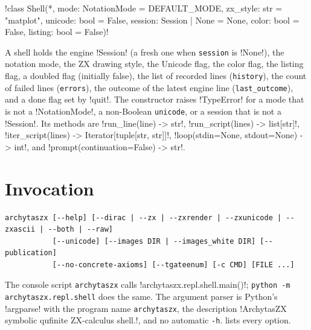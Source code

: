 \begin{signature}
\code!class Shell(*, mode: NotationMode = DEFAULT_MODE, zx_style: str = "matplot", unicode: bool = False, session: Session | None = None, color: bool = False, listing: bool = False)!
\end{signature}
A shell holds the engine \py!Session! (a fresh one when \texttt{session} is \py!None!), the notation mode, the ZX drawing style, the Unicode flag, the color flag, the listing flag, a doubled flag (initially false), the list of recorded lines (\texttt{history}), the count of failed lines (\texttt{errors}), the outcome of the latest engine line (\texttt{last\_outcome}), and a done flag set by \azx!quit!. The constructor raises \py!TypeError! for a mode that is not a \py!NotationMode!, a non-Boolean \texttt{unicode}, or a session that is not a \py!Session!. Its methods are \py!run_line(line) -> str!, \py!run_script(lines) -> list[str]!, \py!iter_script(lines) -> Iterator[tuple[str, str]]!, \py!loop(stdin=None, stdout=None) -> int!, and \py!prompt(continuation=False) -> str!.

\section{Invocation}\label{sec:shell-invocation}

\begin{lstlisting}[style=shell]
archytaszx [--help] [--dirac | --zx | --zxrender | --zxunicode | --zxascii | --both | --raw]
           [--unicode] [--images DIR | --images_white DIR] [--publication]
           [--no-concrete-axioms] [--tgateenum] [-c CMD] [FILE ...]
\end{lstlisting}

The console script \texttt{archytaszx} calls \py!archytaszx.repl.shell.main()!; \texttt{python -m archytaszx.repl.shell} does the same. The argument parser is Python's \py!argparse! with the program name \texttt{archytaszx}, the description \code!ArchytasZX symbolic qufinite ZX-calculus shell.!, and no automatic \texttt{-h}.  lists every option.

